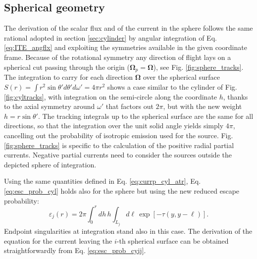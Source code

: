 \documentclass{ictt26}
\begin{document}
\subsection{Spherical geometry}
\label{sec:sphere}

The derivation of the scalar flux and of the current in the sphere follows the same rational adopted in section \ref{sec:cylinder} by angular integration of Eq. \ref{eq:ITE_angflx} and exploiting the symmetries available in the given coordinate frame. Because of the rotational symmetry any direction of flight lays on a spherical cut passing through the origin ($\mathbf{\Omega}_p = \mathbf{\Omega}$), see Fig. \ref{fig:sphere_tracks}. The integration to carry for each direction $\mathbf{\Omega}$ over the spherical surface $S(r) = \int{r^2\sin \theta' d\theta' d\omega'} = 4\pi r^2$ shows a case similar to the cylinder of Fig. \ref{fig:cyltracks}, with integration on the semi-circle along the coordinate $h$, thanks to the axial symmetry around $\omega'$ that factors out $2\pi$, but with the new weight $h = r\sin \theta'$. The tracking integrals up to the spherical surface are the same for all directions, so that the integration over the unit solid angle yields simply $4\pi$, cancelling out the probability of isotropic emission used for the source. Fig. \ref{fig:sphere_tracks} is specific to the calculation of the positive radial partial currents. Negative partial currents need to consider the sources outside the depicted sphere of integration.

Using the same quantities defined in Eq. \ref{eq:currp_cyl_atr}, Eq. \ref{eq:esc_prob_cyl} holds also for the sphere but using the new reduced escape probability:
\begin{equation}
\varepsilon_j(r) = 2\pi \int_0^r { dh\,
  h \int_{L_j}{d \ell \, \exp\left[-\tau( y, y - \ell )\right]}}.
\label{eq:esc_prob_sph}
\end{equation}
Endpoint singularities at integration stand also in this case. The derivation of the equation for the current leaving the $i$-th spherical surface can be obtained straightforwardly from Eq. \ref{eq:esc_prob_cyij}.
\end{document}
